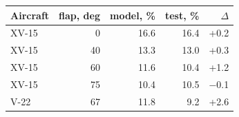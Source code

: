 \begin{tabular}{@{}lrrrr@{}}
\toprule
Aircraft & flap, deg & model, \% & test, \% & $\Delta$ \\
\midrule
XV-15 & 0 & 16.6 & 16.4 & +0.2 \\
XV-15 & 40 & 13.3 & 13.0 & +0.3 \\
XV-15 & 60 & 11.6 & 10.4 & +1.2 \\
XV-15 & 75 & 10.4 & 10.5 & $-$0.1 \\
V-22 & 67 & 11.8 & 9.2 & +2.6 \\
\bottomrule
\end{tabular}
